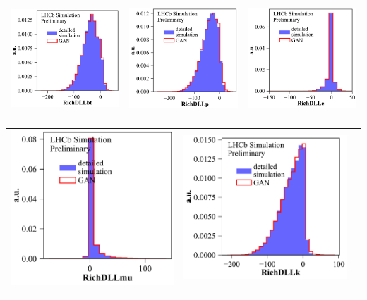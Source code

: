 \documentclass{article}
\begin{document}
\begin{tabular}{l@{\hskip -0.0in}c@{\hskip -0.0in}c}
\vspace{-0.2cm}
\includegraphics[width=0.32\linewidth, height=0.32\linewidth]{hist1d_RichDLLbt.pdf} &
\includegraphics[width=0.32\linewidth, height=0.32\linewidth]{hist1d_RichDLLp.pdf} &
\includegraphics[width=0.32\linewidth, height=0.32\linewidth]{hist1d_RichDLLe.pdf}\\
\vspace{-0.2cm}
\end{tabular}

\begin{tabular}{l@{\hskip -0.0in}c@{\hskip -0.0in}c}
\includegraphics[width=0.32\linewidth, height=0.32\linewidth]{hist1d_RichDLLmu.pdf} &
 \includegraphics[width=0.32\linewidth, height=0.32\linewidth]{hist1d_RichDLLk.pdf} \\
\vspace{-0.2cm}
\end{tabular}
\end{document}
